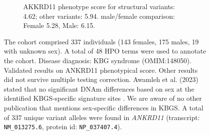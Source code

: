 \begin{figure}[htbp]
\vspace{2em}

\begin{subfigure}[b]{0.95\textwidth}
\captionsetup{justification=raggedright,singlelinecheck=false}
\caption{AKKRD11 phenotype score for structural variants: 4.62; other variants: 5.94. male/female comparison: Female 5.28, Male: 6.15.}
\end{subfigure}

\vspace{2em}

\caption{The cohort comprised 337 individuals (143 females, 175 males, 19 with unknown sex). A total of 48 HPO terms were used to annotate the cohort. Disease diagnosis: KBG syndrome (OMIM:148050). Validated results on ANKRD11 phenotypical score. Other results did not survive multiple testing correction. Awamleh et al. (2023) stated that no significant DNAm differences based on sex at the identified KBGS-specific signature sites \cite{PMID_36440975}. We are aware of no other publication that mentions sex-specific differences in KBGS. A total of 337 unique variant alleles were found in \textit{ANKRD11} (transcript: \texttt{NM\_013275.6}, protein id: \texttt{NP\_037407.4}).}
\end{figure}
